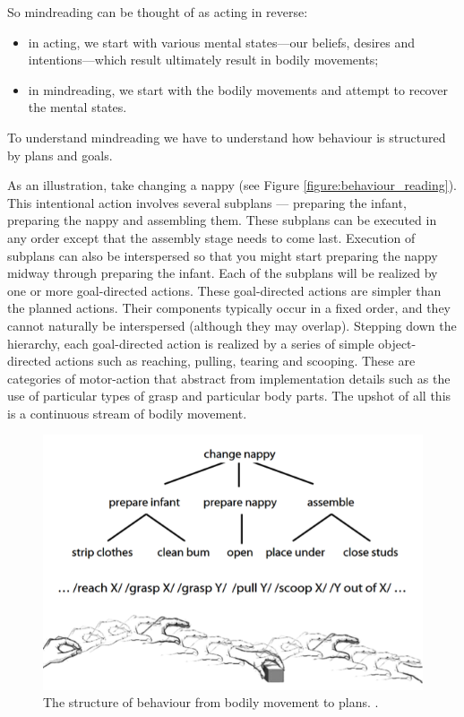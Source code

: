 \documentclass[12pt,\papersize]{extarticle}
\begin{document}
So mindreading can be thought of as acting in reverse:
%
\begin{itemize}
\item in acting, we start with various mental states---our beliefs, desires and intentions---which result ultimately result in bodily movements;
\item in mindreading, we start with the bodily movements and attempt to recover the mental states.
\end{itemize}
%
To understand mindreading  we have to understand how behaviour is structured by plans and goals.  

As an illustration, take changing a nappy (see Figure \vref{figure:behaviour_reading}).  
This intentional action involves several subplans --- preparing the infant, preparing the nappy and assembling them.  
These subplans can be executed in any order except that the assembly stage needs to come last.  
Execution of subplans can also be interspersed so that you might start preparing the nappy midway through preparing the infant.  
Each of the subplans will be realized by one or more goal-directed actions.  
These goal-directed actions are simpler than the planned actions.  
Their components typically occur in a fixed order, and they cannot naturally be interspersed (although they may overlap).  
Stepping down the hierarchy, each goal-directed action is realized by a series of simple object-directed actions such as reaching, pulling, tearing and scooping.  
These are categories of motor-action that abstract from implementation details such as the use of particular types of grasp and particular body parts.  
The upshot of all this is a continuous stream of bodily movement.

\begin{figure}
\begin{center}
\includegraphics{figure_behaviour_reading.png}
\caption{
\label{figure:behaviour_reading}
	The structure of behaviour from bodily movement to plans. \citep[The lower image is adapted from][]{en_1462}.
}
\end{center}
\end{figure}
\end{document}
